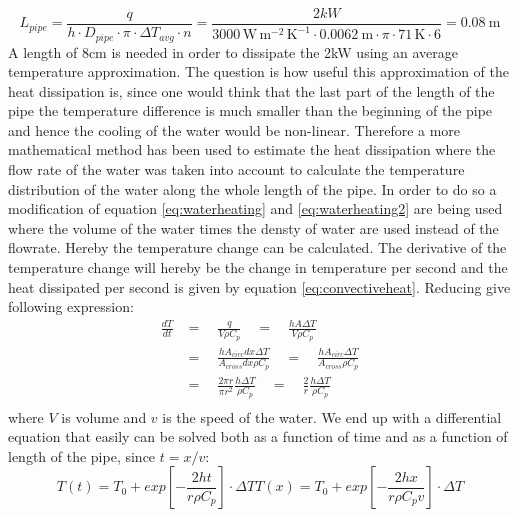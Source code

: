 \begin{equation}
L_{pipe} = \frac{q}{h\cdot D_{pipe} \cdot \pi \cdot \Delta T_{avg} \cdot n} = \frac{2kW}{3000 \, \mathrm{W \, m^{-2} \, K^{-1}} \cdot \SI{0.0062}{\metre} \cdot \pi \cdot 71 \, \mathrm{K} \cdot 6} = \SI{0.08}{\metre}
\end{equation}
A length of 8cm is needed in order to dissipate the 2kW using an average temperature approximation. The question is how useful this approximation of the heat dissipation is, since one would think that the last part of the length of the pipe the temperature difference is much smaller than the beginning of the pipe and hence the cooling of the water would be non-linear. Therefore a more mathematical method has been used to estimate the heat dissipation where the flow rate of the water was taken into account to calculate the temperature distribution of the water along the whole length of the pipe. In order to do so a modification of equation \ref{eq:waterheating} and \ref{eq:waterheating2} are being used where the volume of the water times the densty of water are used instead of the flowrate. Hereby the temperature change can be calculated. The derivative of the temperature change will hereby be the change in temperature per second and the heat dissipated per second is given by equation \ref{eq:convectiveheat}. Reducing give following expression:
\begin{equation}
\begin{aligned}
\frac{dT}{dt} & =  \quad {} \frac{q}{V\rho C_p} \quad = \quad \frac{hA\Delta T}{V\rho C_p}  \\
& = \quad\frac{hA_{circ} dx \Delta T}{A_{cross} dx \rho C_p}\quad =\quad \frac{hA_{circ} \Delta T}{A_{cross} \rho C_p} \\
& =\quad \frac{2\pi r}{\pi r^2} \frac{h\Delta T}{\rho C_p} \quad=\quad \frac{2}{r} \frac{h\Delta T}{\rho C_p} \\
\end{aligned}
\end{equation}
where $V$ is volume and $v$ is the speed of the water. We end up with a differential equation that easily can be solved both as a function of time and as a function of length of the pipe, since $t = x/v$: 
\begin{subequations}
\begin{equation}
T(t) =  T_0 + exp\left[-\frac{2ht}{r\rho C_p}\right]\cdot \Delta T
\end{equation}
\begin{equation}\label{eq:tdiff}
T(x) =  T_0 + exp\left[-\frac{2hx}{r\rho C_p v}\right]\cdot \Delta T
\end{equation}
\end{subequations}
